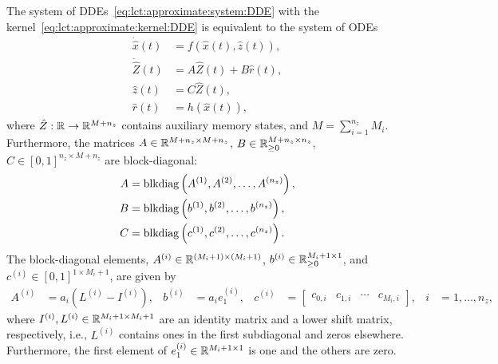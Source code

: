\begin{theorem}\label{thm:linear:chain:trick}
	The system of DDEs~\eqref{eq:lct:approximate:system:DDE} with the kernel~\eqref{eq:lct:approximate:kernel:DDE} is equivalent to the system of ODEs
	\begin{subequations}\label{eq:lct:approximate:system:ODE}
		\begin{align}
			\label{eq:system:approximate:x}
			\dot{\hat x}(t) &= f(\hat x(t), \hat z(t)), \\
			\label{eq:system:approximate:Z}
			\dot{\hat Z}(t) &= A \hat Z(t) + B \hat r(t), \\
			\label{eq:system:approximate:z}
			\hat z(t) &= C \hat Z(t), \\
			\hat r(t) &= h(\hat x(t)),
		\end{align}
	\end{subequations}
	where $\hat Z: \mathbb{R} \rightarrow \mathbb{R}^{M + n_z}$ contains auxiliary memory states, and $M = \sum_{i=1}^{n_z} M_i$. Furthermore, the matrices $A\in \mathbb{R}^{M + n_z \times M + n_z}$, $B \in \mathbb{R}_{\geq 0}^{M + n_z \times n_z}$, $C \in [0, 1]^{n_z \times M + n_z}$ are block-diagonal:
	\begin{subequations}
		\begin{align}
			A &= \operatorname{blkdiag}\left(A^{(1)}, A^{(2)}, \ldots, A^{(n_z)}\right), \\
			B &= \operatorname{blkdiag}\left(b^{(1)}, b^{(2)}, \ldots, b^{(n_z)}\right), \\
			C &= \operatorname{blkdiag}\left(c^{(1)}, c^{(2)}, \ldots, c^{(n_z)}\right).
		\end{align}
	\end{subequations}
	The block-diagonal elements, $A^{(i)} \in \mathbb{R}^{(M_i+1) \times (M_i+1)}$, $b^{(i)} \in \mathbb{R}_{\geq 0}^{M_i+1 \times 1}$, and $c^{(i)} \in [0, 1]^{1 \times M_i+1}$, are given by
	\begin{subequations}
		\begin{align}
			A^{(i)} &= a_i (L^{(i)} - I^{(i)}), &
			b^{(i)} &= a_i e_1^{(i)}, &
			c^{(i)} &=
			\begin{bmatrix}
				c_{0, i} & c_{1, i} & \cdots & c_{M_{i}, i}
			\end{bmatrix}, & i &= 1, \ldots, n_z,
		\end{align}
	\end{subequations}
	where $I^{(i)}, L^{(i)} \in \mathbb{R}^{M_i+1 \times M_i+1}$ are an identity matrix and a lower shift matrix, respectively, i.e., $L^{(i)}$ contains ones in the first subdiagonal and zeros elsewhere. Furthermore, the first element of $e_1^{(i)} \in \mathbb{R}^{M_i+1 \times 1}$ is one and the others are zero.
\end{theorem}
